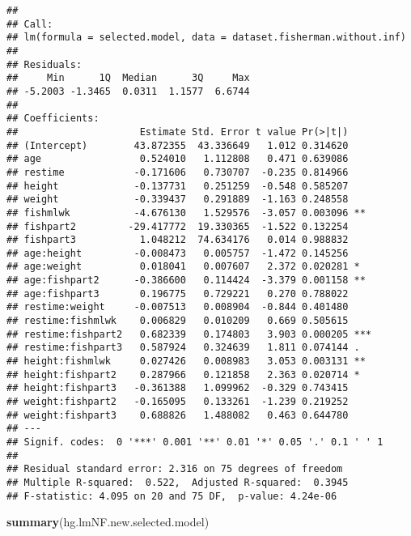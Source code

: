 \documentclass[12pt,]{article}
\newenvironment{Shaded}{\begin{snugshade}}{\end{snugshade}}
\newcommand{\KeywordTok}[1]{\textcolor[rgb]{0.13,0.29,0.53}{\textbf{#1}}}
\newcommand{\NormalTok}[1]{#1}
\begin{document}
\begin{verbatim}
## 
## Call:
## lm(formula = selected.model, data = dataset.fisherman.without.inf)
## 
## Residuals:
##     Min      1Q  Median      3Q     Max 
## -5.2003 -1.3465  0.0311  1.1577  6.6744 
## 
## Coefficients:
##                     Estimate Std. Error t value Pr(>|t|)    
## (Intercept)        43.872355  43.336649   1.012 0.314620    
## age                 0.524010   1.112808   0.471 0.639086    
## restime            -0.171606   0.730707  -0.235 0.814966    
## height             -0.137731   0.251259  -0.548 0.585207    
## weight             -0.339437   0.291889  -1.163 0.248558    
## fishmlwk           -4.676130   1.529576  -3.057 0.003096 ** 
## fishpart2         -29.417772  19.330365  -1.522 0.132254    
## fishpart3           1.048212  74.634176   0.014 0.988832    
## age:height         -0.008473   0.005757  -1.472 0.145256    
## age:weight          0.018041   0.007607   2.372 0.020281 *  
## age:fishpart2      -0.386600   0.114424  -3.379 0.001158 ** 
## age:fishpart3       0.196775   0.729221   0.270 0.788022    
## restime:weight     -0.007513   0.008904  -0.844 0.401480    
## restime:fishmlwk    0.006829   0.010209   0.669 0.505615    
## restime:fishpart2   0.682339   0.174803   3.903 0.000205 ***
## restime:fishpart3   0.587924   0.324639   1.811 0.074144 .  
## height:fishmlwk     0.027426   0.008983   3.053 0.003131 ** 
## height:fishpart2    0.287966   0.121858   2.363 0.020714 *  
## height:fishpart3   -0.361388   1.099962  -0.329 0.743415    
## weight:fishpart2   -0.165095   0.133261  -1.239 0.219252    
## weight:fishpart3    0.688826   1.488082   0.463 0.644780    
## ---
## Signif. codes:  0 '***' 0.001 '**' 0.01 '*' 0.05 '.' 0.1 ' ' 1
## 
## Residual standard error: 2.316 on 75 degrees of freedom
## Multiple R-squared:  0.522,  Adjusted R-squared:  0.3945 
## F-statistic: 4.095 on 20 and 75 DF,  p-value: 4.24e-06
\end{verbatim}

\begin{Shaded}
\begin{Highlighting}[]
\KeywordTok{summary}\NormalTok{(hg.lmNF.new.selected.model)}
\end{Highlighting}
\end{Shaded}
\end{document}
